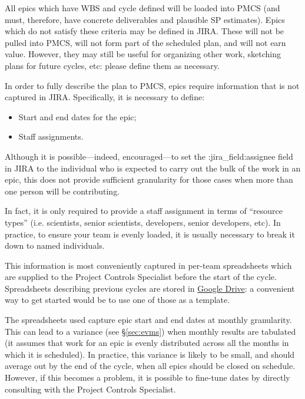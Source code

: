 All epics which have WBS and cycle defined will be loaded into PMCS (and
must, therefore, have concrete deliverables and plausible SP estimates).
Epics which do not satisfy these criteria may be defined in JIRA. These
will not be pulled into PMCS, will not form part of the scheduled plan,
and will not earn value. However, they may still be useful for
organizing other work, sketching plans for future cycles, etc: please
define them as necessary.

In order to fully describe the plan to PMCS, epics require information
that is not captured in JIRA. Specifically, it is necessary to define:

\begin{itemize}
\item
  Start and end dates for the epic;
\item
  Staff assignments.
\end{itemize}

Although it is possible---indeed, encouraged---to set the
:jira\_field:assignee field in JIRA to the individual who is expected to
carry out the bulk of the work in an epic, this does not provide
sufficient granularity for those cases when more than one person will be
contributing.

In fact, it is only required to provide a staff assignment in terms of
``resource types'' (i.e. scientists, senior scientists, developers,
senior developers, etc). In practice, to ensure your team is evenly
loaded, it is usually necessary to break it down to named individuals.

This information is most conveniently captured in per-team spreadsheets
which are supplied to the Project Controls Specialist before the start
of the cycle. Spreadsheets describing previous cycles are stored in
\href{https://drive.google.com/drive/u/0/folders/0BxgFbTQURmr6TmxXSm5Dc1JJWk0}{Google
Drive}: a convenient way to get started would be to use one of those as
a template.

The spreadsheets used capture epic start and end dates at monthly
granularity. This can lead to a
variance (see \S\ref{sec:evms}) when monthly results are
tabulated (it assumes that work for an epic is evenly distributed across
all the months in which it is scheduled). In practice, this variance is
likely to be small, and should average out by the end of the cycle, when
all epics should be closed on schedule. However, if this becomes a
problem, it is possible to fine-tune dates by directly consulting with
the Project Controls Specialist.

